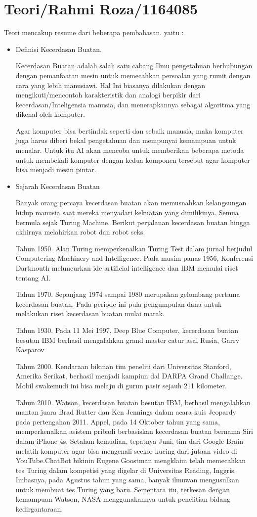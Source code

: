 \section{Teori/Rahmi Roza/1164085}
Teori mencakup resume dari beberapa pembahasan. yaitu :
\begin{itemize}
\item Definisi Kecerdasan Buatan.
\par Kecerdasan Buatan adalah salah satu cabang Ilmu pengetahuan berhubungan dengan pemanfaatan mesin untuk memecahkan persoalan yang rumit dengan cara yang lebih manusiawi. Hal Ini biasanya dilakukan dengan mengikuti/mencontoh karakteristik dan analogi berpikir dari kecerdasan/Inteligensia manusia, dan menerapkannya sebagai algoritma yang dikenal oleh komputer.
\par Agar komputer bisa bertindak seperti dan sebaik manusia, maka komputer juga harus diberi bekal pengetahuan dan mempunyai kemampuan untuk menalar. Untuk itu AI akan mencoba untuk memberikan beberapa metoda untuk membekali komputer dengan kedua komponen tersebut agar komputer bisa menjadi mesin pintar.
\item Sejarah Kecerdasan Buatan
\par Banyak orang percaya kecerdasan buatan akan memusnahkan kelangsungan hidup manusia saat mereka menyadari kekuatan yang dimilikinya. Semua bermula sejak Turing Machine. Berikut perjalanan kecerdasan buatan hingga akhirnya melahirkan robot dan robot seks.
\par Tahun 1950. Alan Turing memperkenalkan Turing Test dalam jurnal berjudul Computering Machinery and Intelligence. Pada musim panas 1956, Konferensi Dartmouth meluncurkan ide artificial intelligence dan IBM memulai riset tentang AI.
\par Tahun 1970. Sepanjang 1974 sampai 1980 merupakan gelombang pertama kecerdasan buatan. Pada periode ini pula pengumpulan dana untuk melakukan riset kecerdasan buatan mulai marak.
\par Tahun 1930. Pada 11 Mei 1997, Deep Blue Computer, kecerdasan buatan besutan IBM berhasil mengalahkan grand master catur asal Rusia, Garry Kasparov
\par Tahun 2000. Kendaraan bikinan tim peneliti dari Universitas Stanford, Amerika Serikat, berhasil menjadi kampiun dal DARPA Grand Challange. Mobil swakemudi ini bisa melaju di gurun pasir sejauh 211 kilometer.
\par Tahun 2010. Watson, kecerdasan buatan besutan IBM, berhasil mengalahkan mantan juara Brad Rutter dan Ken Jennings dalam acara kuis Jeopardy pada pertengahan 2011. Appel, pada 14 Oktober tahun yang sama, memperkenalkan asistem pribadi berbasiskan kecerdasan buatan bernama Siri dalam iPhone 4s. Setahun kemudian, tepatnya Juni, tim dari Google Brain melatih komputer agar bisa mengenali seekor kucing dari jutaan video di YouTube.ChatBot bikinin Eugene Goostman mengklaim telah memecahkan tes Turing dalam kompetisi yang digelar di Universitas Reading, Inggris. Imbasnya, pada Agustus tahun yang sama, banyak ilmuwan mengusulkan untuk membuat tes Turing yang baru. Sementara itu, terkesan dengan kemampuan Watson, NASA menggunakannya untuk penelitian bidang kedirgantaraan.

\end{itemize}
